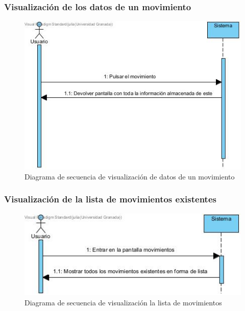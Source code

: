 \subsubsection{Visualización de los datos de un movimiento}

\begin{figure}[H]
	\centering
	\includegraphics[width=1\textwidth]{imagenes/imagenesDiagramas/Movimientos/visualizarDatosMovimiento.jpg}
	\caption{Diagrama de secuencia de visualización de datos de un movimiento}
	\label{fig:seqdiag23}
\end{figure}

\subsubsection{Visualización de la lista de movimientos existentes}

\begin{figure}[H]
	\centering
	\includegraphics[width=1\textwidth]{imagenes/imagenesDiagramas/Movimientos/visualizarListaMovimientos.jpg}
	\caption{Diagrama de secuencia de visualización la lista de movimientos}
	\label{fig:seqdiag24}
\end{figure}

